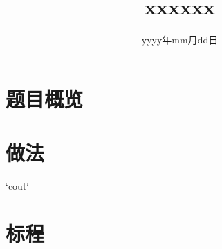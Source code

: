 \documentclass{ctsol}
\title{xxxxxx}
\date{yyyy年mm月dd日}
\begin{document}

\maketitle
{}

\section*{题目概览}
\solutiontab

\makesolution
\section*{做法}
`cout`

\section*{标程}
\end{document}
